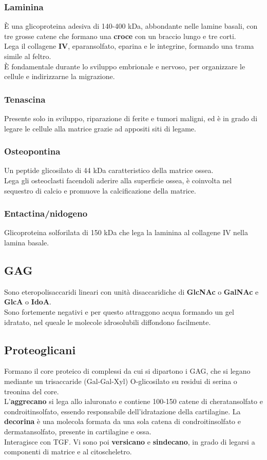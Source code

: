 \documentclass[a4paper, 12pt]{article}
\begin{document}
\subsubsection{Laminina}
È una glicoproteina adesiva di 140-400 kDa, abbondante nelle lamine basali, con tre grosse catene che formano una \textbf{croce} con un braccio lungo e tre corti.\\
Lega il collagene \textbf{IV}, eparansolfato, eparina e le integrine, formando una trama simile al feltro.\\
È fondamentale durante lo sviluppo embrionale e nervoso, per organizzare le cellule e indirizzarne la migrazione.

\subsubsection{Tenascina}
Presente solo in sviluppo, riparazione di ferite e tumori maligni, ed è in grado di legare le cellule alla matrice grazie ad appositi siti di legame.

\subsubsection{Osteopontina}
Un peptide glicosilato di 44 kDa caratteristico della matrice ossea.\\
Lega gli osteoclasti facendoli aderire alla superficie ossea, è coinvolta nel sequestro di calcio e promuove la calcificazione della matrice.

\subsubsection{Entactina/nidogeno}
Glicoproteina solforilata di 150 kDa che lega la laminina al collagene IV nella lamina basale.

\subsection{GAG}
Sono eteropolisaccaridi lineari con unità disaccaridiche di \textbf{GlcNAc} o \textbf{GalNAc} e \textbf{GlcA} o \textbf{IdoA}.\\
Sono fortemente negativi e per questo attraggono acqua formando un gel idratato, nel queale le molecole idrosolubili diffondono facilmente.

\subsection{Proteoglicani}
Formano il core proteico di complessi da cui si dipartono i GAG, che si legano mediante un trisaccaride (Gal-Gal-Xyl) O-glicosilato su residui di serina o treonina del core.\\
L'\textbf{aggrecano} si lega allo ialuronato e contiene 100-150 catene di cheratansolfato e condroitinsolfato, essendo responsabile dell'idratazione della cartilagine.
La \textbf{decorina} è una molecola formata da una sola catena di condroitinsolfato e dermatansolfato, presente in cartilagine e ossa.\\ Interagisce con TGF\textbeta.
Vi sono poi \textbf{versicano} e \textbf{sindecano}, in grado di legarsi a componenti di matrice e al citoscheletro.
\end{document}
